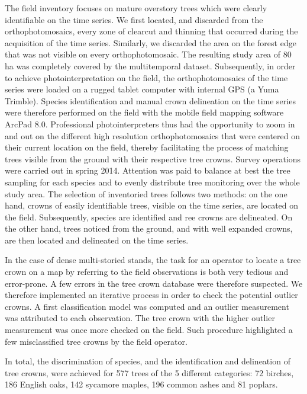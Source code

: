 \documentclass[remotesensing,article,submit,moreauthors,pdftex,12pt,a4paper]{mdpi} %
\begin{document}
The field inventory focuses on mature overstory trees which were clearly identifiable on the time series. 
We first located, and discarded from the orthophotomosaics, every zone of clearcut and thinning that occurred during the acquisition of the time series. 
Similarly, we discarded the area on the forest edge that was not visible on every orthophotomosaic. 
The resulting study area of 80 ha was completely covered by the multitemporal dataset. 
Subsequently, in order to achieve photointerpretation on the field, the orthophotomosaics of the time series were loaded on a rugged tablet computer with internal GPS (a Yuma Trimble\textsuperscript{\textregistered}). 
Species identification and manual crown delineation on the time series were therefore performed on the field with the mobile field mapping software ArcPad 8.0. 
Professional photointerpreters thus had the opportunity to zoom in and out on the different high resolution orthophotomosaics that were centered on their current location on the field, thereby facilitating the process of matching trees visible from the ground with their respective tree crowns. 
Survey operations were carried out in spring 2014.
Attention was paid to balance at best the tree sampling for each species and to evenly distribute tree monitoring over the whole study area. 
The selection of inventoried trees follows two methods: on the one hand, crowns of easily identifiable trees, visible on the time series, are located on the field. 
Subsequently, species are identified and ree crowns are delineated. 
On the other hand, trees noticed from the ground, and with well expanded crowns, are then located and delineated on the time series. 

In the case of dense multi-storied stands, the task for an operator to locate a tree crown on a map by referring to the field observations is both very tedious and error-prone. 
A few errors in the tree crown database were therefore suspected. 
We therefore implemented an iterative process in order to check the potential outlier crowns. 
A first classification model was computed and an outlier measurement was attributed to each observation. 
The tree crown with the higher outlier measurement was once more checked on the field. 
Such procedure highlighted a few misclassified tree crowns by the field operator.

In total, the discrimination of species, and the identification and delineation of tree crowns, were achieved for 577 trees of the 5 different categories: 72 birches, 186 English oaks, 142 sycamore maples, 196 common ashes and 81 poplars.
\end{document}
